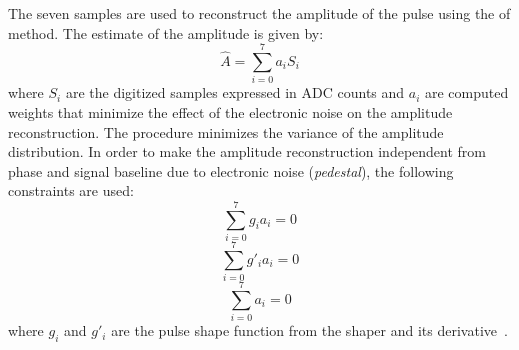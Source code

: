 The seven samples are used to reconstruct the amplitude of the pulse using the
\gls{of} method. The estimate of the amplitude is given by:
\begin{equation}
  \label{eq:80}
  \hat{A} = \sum_{i = 0}^7 a_i S_i
\end{equation}
where $S_i$ are the digitized samples expressed in ADC counts and $a_i$ are
computed weights that minimize the effect of the electronic noise on the
amplitude reconstruction. The procedure minimizes the variance of the amplitude
distribution. In order to make the amplitude reconstruction independent from
phase and signal baseline due to electronic noise (\emph{pedestal}), the
following constraints are used:
\begin{equation}
  \label{eq:81}
  \sum_{i = 0}^7 g_i a_i = 0
\end{equation}
\begin{equation}
  \label{eq:82}
  \sum_{i = 0}^7 g'_i a_i = 0
\end{equation}
\begin{equation}
  \label{eq:83}
  \sum_{i = 0}^7 a_i = 0
\end{equation}
where $g_i$ and $g'_i$ are the pulse shape function from the shaper and its
derivative~\cite{OptimalFilter}.
